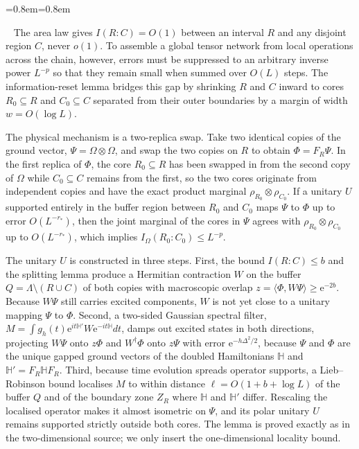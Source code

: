 \documentclass[aps,prx,reprint,superscriptaddress,floatfix,nofootinbib,longbibliography,amsmath,amssymb]{revtex4-2}
\newcommand{\Om}{\Omega}
\newcommand{\Lam}{\Lambda}
\newcommand{\e}{\mathrm e}
\theoremstyle{plain}
\theoremstyle{definition}
\newenvironment{inwords}{%
  \par\medskip\noindent
  \begin{list}{}{\leftmargin=0.8em\rightmargin=0.8em}
  \item\relax
  \noindent{\sffamily\bfseries\color{blue!40!black}In words.}\ \sffamily\small}{%
  \end{list}\par\medskip}
\begin{document}
\begin{inwords}
The area law gives $I(R:C)=O(1)$ between an interval $R$ and any disjoint
region $C$, never $o(1)$. To assemble a global tensor network from local
operations across the chain, however, errors must be suppressed to an
arbitrary inverse power $L^{-p}$ so that they remain small when summed over
$O(L)$ steps. The information-reset lemma bridges this gap by shrinking $R$
and $C$ inward to cores $R_0\subseteq R$ and $C_0\subseteq C$ separated from
their outer boundaries by a margin of width $w=O(\log L)$.

The physical mechanism is a two-replica swap. Take two identical copies of
the ground vector, $\Psi=\Om\otimes\Om$, and swap the two copies on $R$ to
obtain $\Phi=F_R\Psi$. In the first replica of $\Phi$, the core $R_0\subseteq R$
has been swapped in from the second copy of $\Om$ while $C_0\subseteq C$
remains from the first, so the two cores originate from independent copies and
have the exact product marginal $\rho_{R_0}\otimes\rho_{C_0}$. If a unitary $U$
supported entirely in the buffer region between $R_0$ and $C_0$ maps $\Psi$
to $\Phi$ up to error $O(L^{-r_*})$, then the joint marginal of the cores in
$\Psi$ agrees with $\rho_{R_0}\otimes\rho_{C_0}$ up to $O(L^{-r_*})$, which
implies $I_\Om(R_0:C_0)\le L^{-p}$.

The unitary $U$ is constructed in three steps. First, the bound $I(R:C)\le b$
and the splitting lemma produce a Hermitian contraction $W$ on the buffer
$Q=\Lam\setminus(R\cup C)$ of both copies with macroscopic overlap
$z=\langle\Phi,W\Psi\rangle\ge\e^{-2b}$. Because $W\Psi$ still carries excited
components, $W$ is not yet close to a unitary mapping $\Psi$ to $\Phi$.
Second, a two-sided Gaussian spectral filter,
$M=\int g_h(t)\e^{it\mathbb H'}W\e^{-it\mathbb H}dt$, damps out excited states
in both directions, projecting $W\Psi$ onto $z\Phi$ and $W^\dagger\Phi$ onto
$z\Psi$ with error $\e^{-h\Delta^2/2}$, because $\Psi$ and $\Phi$ are the unique
gapped ground vectors of the doubled Hamiltonians $\mathbb H$ and
$\mathbb H'=F_R\mathbb HF_R$. Third, because time evolution spreads operator
supports, a Lieb--Robinson bound localises $M$ to within distance
$\ell=O(1+b+\log L)$ of the buffer $Q$ and of the boundary zone $Z_R$ where
$\mathbb H$ and $\mathbb H'$ differ. Rescaling the localised operator makes it
almost isometric on $\Psi$, and its polar unitary $U$ remains supported strictly
outside both cores. The lemma is proved exactly as in the two-dimensional
source; we only insert the one-dimensional locality bound.
\end{inwords}
\end{document}
